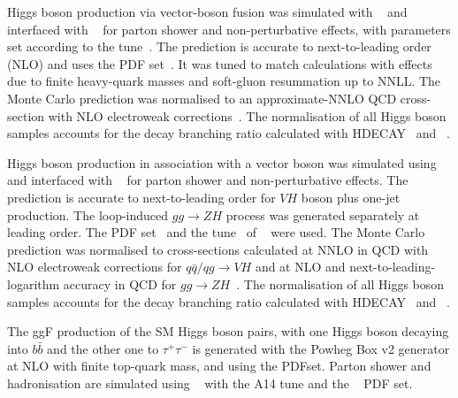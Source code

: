     Higgs boson production via vector-boson fusion was simulated with
    \POWHEGBOX[v2]~\cite{Nason:2009ai,Alioli:2010xd,Nason:2004rx,Frixione:2007vw} 
    and interfaced with \PYTHIA[8]~\cite{Sjostrand:2014zea} for parton shower and non-perturbative effects,
    with parameters set according to the \AZNLO tune~\cite{STDM-2012-23}.
    The \POWHEG prediction is accurate to next-to-leading order (NLO) and uses
    the \PDFforLHC[15nlo] PDF set~\cite{Butterworth:2015oua}. 
    It was tuned to match calculations with effects due to finite heavy-quark masses 
    and soft-gluon resummation up to NNLL.
    The Monte Carlo prediction was normalised to an approximate-NNLO QCD cross-section 
    with NLO electroweak corrections~\cite{Ciccolini:2007jr,Ciccolini:2007ec,Bolzoni:2010xr}. 
    The normalisation of all Higgs boson samples accounts for the decay branching ratio calculated 
    with \textsc{HDECAY}~\cite{Djouadi:1997yw,Spira:1997dg,Djouadi:2006bz} 
    and \PROPHECY~\cite{Bredenstein:2006ha,Bredenstein:2006rh,Bredenstein:2006nk}.

    Higgs boson production in association with a vector boson was simulated using
    \POWHEGBOX[v2]~\cite{Nason:2009ai,Alioli:2010xd,Nason:2004rx,Frixione:2007vw} and interfaced with \PYTHIA[8]~\cite{Sjostrand:2014zea} for
    parton shower and non-perturbative effects. The \POWHEG prediction is accurate to next-to-leading order for $VH$ boson plus one-jet production. 
    The loop-induced $gg\to ZH$ process was generated separately at leading order. The \PDFforLHC[15nlo] PDF
    set~\cite{Butterworth:2015oua} and the \AZNLO tune~\cite{STDM-2012-23} of \PYTHIA[8]~\cite{Sjostrand:2014zea} were used. The Monte Carlo
    prediction was normalised to cross-sections calculated at NNLO in QCD with NLO electroweak corrections for $q\bar{q}/qg \to VH$ and at NLO
    and next-to-leading-logarithm accuracy in QCD for $gg \to
    ZH$~\cite{Ciccolini:2003jy,Brein:2003wg,Brein:2011vx,Altenkamp:2012sx,Denner:2014cla,Brein:2012ne,Harlander:2014wda}. The
    normalisation of all Higgs boson samples accounts for the decay branching ratio calculated with 
    HDECAY~\cite{Djouadi:1997yw,Spira:1997dg,Djouadi:2006bz} and \PROPHECY~\cite{Bredenstein:2006ha,Bredenstein:2006rh,Bredenstein:2006nk}.

    The ggF production of the SM Higgs boson pairs, with one Higgs boson decaying into $b\bar{b}$ 
    and the other one to $\tau^+\tau^-$ is generated with the Powheg Box v2 generator at 
    NLO with finite top-quark mass, and using the \PDFforLHC[15nlo]
    PDFset. Parton shower and hadronisation are simulated using \PYTHIA[8.244]~\cite{Sjostrand:2014zea}
    with the A14 tune and the \NNPDF[2.3lo]~\cite{Ball:2012cx} PDF set. 

